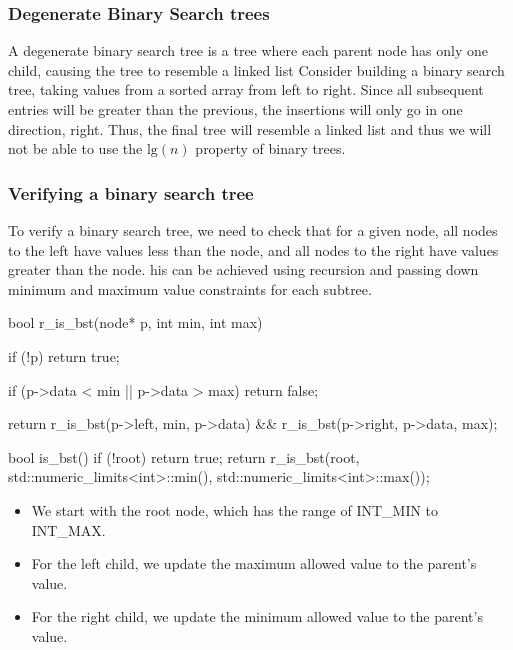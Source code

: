 \documentclass{report}
\begin{document}
    \pagebreak 
    \subsubsection{Degenerate Binary Search trees}
    \bigbreak \noindent 
    A degenerate binary search tree is a tree where each parent node has only one child, causing the tree to resemble a linked list
    \bigbreak \noindent 
    Consider building a binary search tree, taking values from a sorted array from left to right. Since all subsequent entries will be greater than the previous, the insertions will only go in one direction, right. Thus, the final tree will resemble a linked list and thus we will not be able to use the $\text{lg}(n)$ property of binary trees.

    \bigbreak \noindent 
    \subsubsection{Verifying a binary search tree}
    \bigbreak \noindent 
    To verify a binary search tree, we need to check that for a given node, all nodes to the left have values less than the node, and all nodes to the right have values greater than the node. his can be achieved using recursion and passing down minimum and maximum value constraints for each subtree.
    \bigbreak \noindent 
    \begin{cppcode}
        bool r_is_bst(node* p, int min, int max) {
            if (!p) return true;

            if (p->data < min || p->data > max) return false;

            return r_is_bst(p->left, min, p->data) && r_is_bst(p->right, p->data, max);
        }

        bool is_bst() {
            if (!root) return true;
            return r_is_bst(root, std::numeric_limits<int>::min(), std::numeric_limits<int>::max());
        }
    \end{cppcode}
    \bigbreak \noindent 
    \begin{itemize}
        \item We start with the root node, which has the range of INT\_MIN to INT\_MAX.
        \item For the left child, we update the maximum allowed value to the parent’s value.
        \item For the right child, we update the minimum allowed value to the parent’s value.
    \end{itemize}
\end{document}
